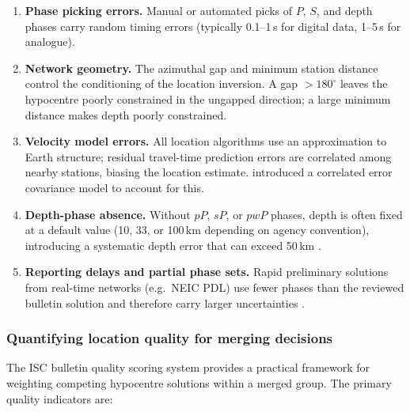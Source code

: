 \documentclass[12pt]{article}
\begin{document}
\begin{enumerate}
  \item \textbf{Phase picking errors.}  Manual or automated picks of $P$, $S$,
        and depth phases carry random timing errors (typically 0.1--1\,s for
        digital data, 1--5\,s for analogue).

  \item \textbf{Network geometry.}  The azimuthal gap and minimum station
        distance control the conditioning of the location inversion.  A gap
        $> 180^\circ$ leaves the hypocentre poorly constrained in the
        ungapped direction; a large minimum distance makes depth poorly
        constrained.

  \item \textbf{Velocity model errors.}  All location algorithms use an
        approximation to Earth structure; residual travel-time prediction errors
        are correlated among nearby stations, biasing the location estimate.
        \citet{Bondar2011} introduced a correlated error covariance model to
        account for this.

  \item \textbf{Depth-phase absence.}  Without $pP$, $sP$, or $pwP$ phases,
        depth is often fixed at a default value (10, 33, or 100\,km depending
        on agency convention), introducing a systematic depth error that can
        exceed 50\,km \citep{Engdahl1998, Engdahl2020}.

  \item \textbf{Reporting delays and partial phase sets.}  Rapid preliminary
        solutions from real-time networks (e.g.\ NEIC PDL) use fewer phases
        than the reviewed bulletin solution and therefore carry larger
        uncertainties \citep{usgs_comcat}.
\end{enumerate}

\subsubsection{Quantifying location quality for merging decisions}

The ISC bulletin quality scoring system \citep{Bondar2011} provides a practical
framework for weighting competing hypocentre solutions within a merged group.
The primary quality indicators are:
\end{document}
